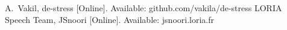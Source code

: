 \documentclass[a4paper]{article}
\newcommand{\TODO}[1]{{\color{red}\textbf{[TODO #1]}}}
\begin{document}
%	
%	
%	
	
	


  \eightpt

  
  \begin{thebibliography}{1}
  A.\ Vakil, de-stress [Online]. Available: github.com/vakila/de-stress
  LORIA Speech Team, JSnoori [Online]. Available: jsnoori.loria.fr
  \end{thebibliography}

\end{document}
